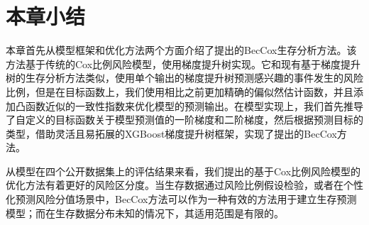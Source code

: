 \section{本章小结}

本章首先从模型框架和优化方法两个方面介绍了提出的BecCox生存分析方法。该方法基于传统的Cox比例风险模型，使用梯度提升树实现。它和现有基于梯度提升树的生存分析方法类似，使用单个输出的梯度提升树预测感兴趣的事件发生的风险比例，但是在目标函数上，我们使用相比之前更加精确的偏似然估计函数，并且添加凸函数近似的一致性指数来优化模型的预测输出。在模型实现上，我们首先推导了自定义的目标函数关于模型预测值的一阶梯度和二阶梯度，然后根据预测目标的类型，借助灵活且易拓展的XGBoost梯度提升树框架，实现了提出的BecCox方法。

从模型在四个公开数据集上的评估结果来看，我们提出的基于Cox比例风险模型的优化方法有着更好的风险区分度。当生存数据通过风险比例假设检验，或者在个性化预测风险分值场景中，BecCox方法可以作为一种有效的方法用于建立生存预测模型；而在生存数据分布未知的情况下，其适用范围是有限的。
